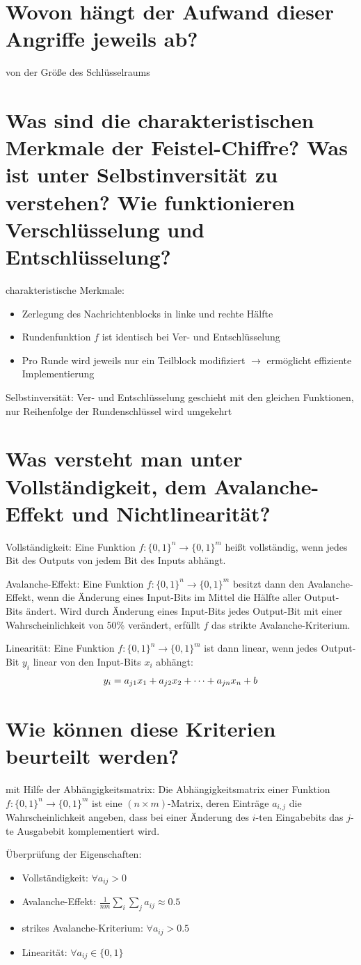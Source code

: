 \documentclass{article}
\begin{document}
	\section*{Wovon hängt der Aufwand dieser Angriffe jeweils ab?}
	von der Größe des Schlüsselraums
	
	\section*{Was sind die charakteristischen Merkmale der Feistel-Chiffre? Was ist unter Selbstinversität zu verstehen? Wie funktionieren Verschlüsselung und Entschlüsselung?}
	charakteristische Merkmale:
	\begin{itemize}
		\item Zerlegung des Nachrichtenblocks in linke und rechte Hälfte
		\item Rundenfunktion $f$ ist identisch bei Ver- und Entschlüsselung
		\item Pro Runde wird jeweils nur ein Teilblock modifiziert $\to$ ermöglicht effiziente Implementierung
	\end{itemize}

	Selbstinversität: Ver- und Entschlüsselung geschieht mit den gleichen Funktionen, nur Reihenfolge der Rundenschlüssel wird umgekehrt
	
	\section*{Was versteht man unter Vollständigkeit, dem Avalanche-Effekt und Nichtlinearität?}
	Vollständigkeit: Eine Funktion $f: \{0,1\}^n \to \{0,1\}^m$ heißt vollständig, wenn jedes Bit des Outputs von jedem Bit des Inputs abhängt.
	
	Avalanche-Effekt: Eine Funktion $f: \{0,1\}^n \to \{0,1\}^m$ besitzt dann den Avalanche-Effekt, wenn die Änderung eines Input-Bits im Mittel die Hälfte aller Output-Bits ändert. Wird durch Änderung eines Input-Bits jedes Output-Bit mit einer Wahrscheinlichkeit von 50\% verändert, erfüllt $f$ das strikte Avalanche-Kriterium.
	
	Linearität: Eine Funktion $f: \{0,1\}^n \to \{0,1\}^m$ ist dann linear, wenn jedes Output-Bit $y_i$ linear von den Input-Bits $x_i$ abhängt:
	\begin{align}
		y_i = a_{j1}x_1 + a_{j2}x_2 + \dots + a_{jn}x_n + b \notag
	\end{align}
	
	\section*{Wie können diese Kriterien beurteilt werden?}
	mit Hilfe der Abhängigkeitsmatrix: Die Abhängigkeitsmatrix einer Funktion $f: \{0,1\}^n \to \{0,1\}^m$ ist eine $(n \times m)$-Matrix, deren Einträge $a_{i,j}$ die Wahrscheinlichkeit angeben, dass bei einer Änderung des $i$-ten Eingabebits das $j$-te Ausgabebit komplementiert wird.
	
	Überprüfung der Eigenschaften:
	\begin{itemize}
		\item Vollständigkeit: $\forall a_{ij} > 0$
		\item Avalanche-Effekt: $\frac{1}{nm}\sum_i \sum_j a_{ij} \approx 0.5$
		\item strikes Avalanche-Kriterium: $\forall a_{ij} > 0.5$
		\item Linearität: $\forall a_{ij} \in \{0,1\}$
	\end{itemize}
	
\end{document}
